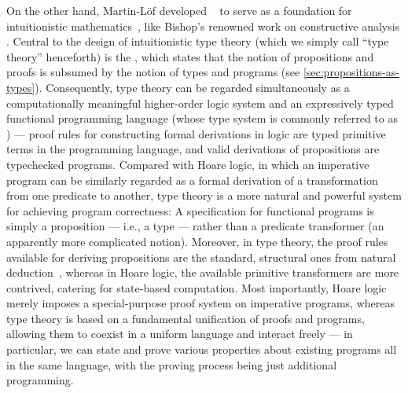 On the other hand, Martin-Löf developed ~\citep{ML-TT73, ML-TT84, Nordstrom-programming} to serve as a foundation for intuitionistic mathematics~\citep{Heyting-intuitionism, Dummett-intuitionism}, like Bishop's renowned work on constructive analysis \citep{Bishop-analysis}.
Central to the design of intuitionistic type theory (which we simply call ``type theory'' henceforth) is the , which states that the notion of propositions and proofs is subsumed by the notion of types and programs (see \autoref{sec:propositions-as-types}).
Consequently, type theory can be regarded simultaneously as a computationally meaningful higher-order logic system and an expressively typed functional programming language (whose type system is commonly referred to as ) --- proof rules for constructing formal derivations in logic are typed primitive terms in the programming language, and valid derivations of propositions are typechecked programs.
Compared with Hoare logic, in which an imperative program can be similarly regarded as a formal derivation of a transformation from one predicate to another, type theory is a more natural and powerful system for achieving program correctness:
A specification for functional programs is simply a proposition --- i.e., a type --- rather than a predicate transformer (an apparently more complicated notion).
Moreover, in type theory, the proof rules available for deriving propositions are the standard, structural ones from natural deduction~\citep{Gentzen-investigations-into-natural-deduction, Prawitz-natural-deduction}, whereas in Hoare logic, the available primitive transformers are more contrived, catering for state-based computation.
Most importantly, Hoare logic merely imposes a special-purpose proof system on imperative programs, whereas type theory is based on a fundamental unification of proofs and programs, allowing them to coexist in a uniform language and interact freely --- in particular, we can state and prove various properties about existing programs all in the same language, with the proving process being just additional programming.

